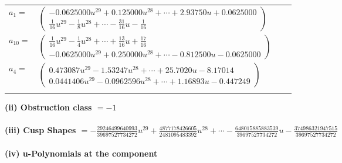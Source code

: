 \documentclass[1p]{elsarticle_modified}
\theoremstyle{definition}
\begin{document}
\begin{tabular}{m{7pt} m{180pt} m{7pt} m{180pt} }
\flushright $a_{1}=$&$\begin{pmatrix}-0.0625000 u^{29}+0.125000 u^{28}+\cdots+2.93750 u+0.0625000\\\frac{1}{16} u^{29}-\frac{1}{8} u^{28}+\cdots-\frac{31}{16} u-\frac{1}{16}\end{pmatrix}$ \\
\flushright $a_{10}=$&$\begin{pmatrix}\frac{1}{16} u^{29}-\frac{1}{4} u^{28}+\cdots+\frac{13}{16} u+\frac{17}{16}\\-0.0625000 u^{29}+0.250000 u^{28}+\cdots-0.812500 u-0.0625000\end{pmatrix}$ \\
\flushright $a_{4}=$&$\begin{pmatrix}0.473087 u^{29}-1.53247 u^{28}+\cdots+25.7020 u-8.17014\\0.0441406 u^{29}-0.0962596 u^{28}+\cdots+1.16893 u-0.447249\end{pmatrix}$\\&\end{tabular}
\flushleft \textbf{(ii) Obstruction class $= -1$}\\~\\
\flushleft \textbf{(iii) Cusp Shapes $= -\frac{29246499640993}{39697527734272} u^{29}+\frac{4877178426605}{2481095483392} u^{28}+\cdots-\frac{648015885883539}{39697527734272} u-\frac{374986321947515}{39697527734272}$}\\~\\
\newpage\renewcommand{\arraystretch}{1}
\flushleft \textbf{(iv) u-Polynomials at the component}\newline \\
\end{document}
